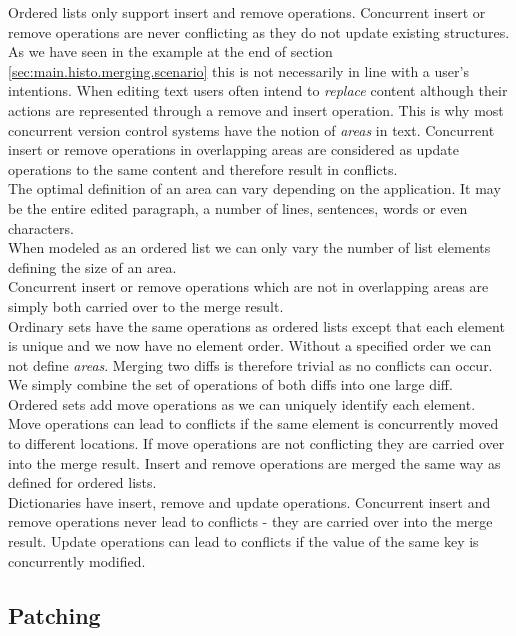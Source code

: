 Ordered lists only support insert and remove operations.
Concurrent insert or remove operations are never conflicting as they do not update existing structures.
As we have seen in the example at the end of section \ref{sec:main.histo.merging.scenario} this is not necessarily in line with a user's intentions.
When editing text users often intend to \emph{replace} content although their actions are represented through a remove and insert operation.
This is why most concurrent version control systems have the notion of \emph{areas} in text.
Concurrent insert or remove operations in overlapping areas are considered as update operations to the same content and therefore result in conflicts.\\
The optimal definition of an area can vary depending on the application.
It may be the entire edited paragraph, a number of lines, sentences, words or even characters.\\
When modeled as an ordered list we can only vary the number of list elements defining the size of an area.\\
Concurrent insert or remove operations which are not in overlapping areas are simply both carried over to the merge result.\\

Ordinary sets have the same operations as ordered lists except that each element is unique and we now have no element order.
Without a specified order we can not define \emph{areas}.
Merging two diffs is therefore trivial as no conflicts can occur.
We simply combine the set of operations of both diffs into one large diff.\\

Ordered sets add move operations as we can uniquely identify each element.
Move operations can lead to conflicts if the same element is concurrently moved to different locations.
If move operations are not conflicting they are carried over into the merge result.
Insert and remove operations are merged the same way as defined for ordered lists.\\

Dictionaries have insert, remove and update operations.
Concurrent insert and remove operations never lead to conflicts - they are carried over into the merge result.
Update operations can lead to conflicts if the value of the same key is concurrently modified.

\subsection{Patching}
\label{sec:main.histo.patching}

